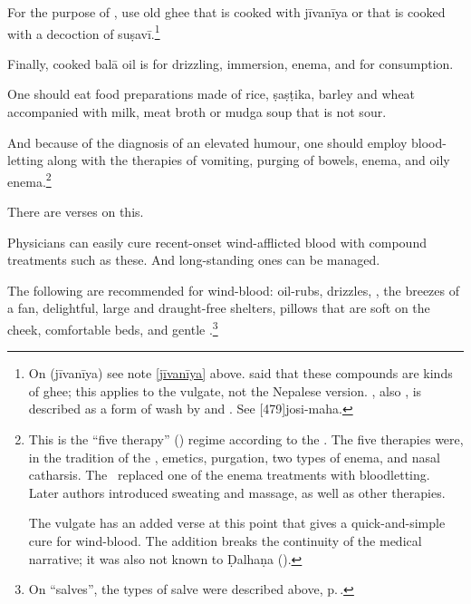 \begin{translation}
For the purpose of , use old ghee that is cooked with
\gls{jīvanīya} or that is cooked with a decoction of
\gls{suṣavī}.\footnote{On  (\gls{jīvanīya}) see note
    \ref{jīvanīya} above.  said that these compounds
    are kinds of ghee; this applies to the vulgate, not the Nepalese
    version.  , also , is described as a form of wash by  and .  See [479]{josi-maha}.}
    
            
Finally, cooked \gls{balā} oil is for drizzling, immersion, enema, and for
consumption.     
    
One should eat food preparations made of rice, \gls{ṣaṣṭika}, barley
and wheat accompanied with milk, meat broth or \gls{mudga} soup that
is not sour.   

And because of the diagnosis of an elevated humour, one should employ
blood-letting along with the therapies of vomiting, purging of bowels,
enema, and oily enema.\footnote{This is the “five therapy”
    () regime according to the \SS.  The five therapies
    were, in the tradition of the \CS, emetics, purgation, two types of
    enema, and nasal catharsis. The \SS\ replaced one of the enema
    treatments with bloodletting. Later authors introduced sweating and
    massage, as well as other therapies.
    
    The vulgate has an added verse at this point that gives a quick-and-simple cure for wind-blood.  The addition breaks 
    the continuity of the medical narrative; it was also not known to Ḍalhaṇa ().}
 
 
     
\item[14]

There are verses on this.

\begin{sloka}
Physicians can easily cure recent-onset
wind-afflicted blood with compound treatments such as these.  
And long-standing ones can be managed.
\end{sloka}

\item[15--16]

\begin{sloka}    
    The following are recommended for wind-blood: oil-rubs, drizzles,  , the breezes of a
    fan,  delightful, large and draught-free shelters,  
        pillows that are soft on the cheek, 
        comfortable beds, 
       and gentle .\footnote{On
           “salves”, the types of salve were
           described above, p.\,\pageref{pradeha}.
           
}
\end{sloka}
\end{translation}
